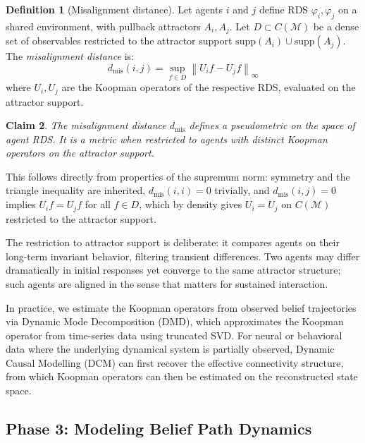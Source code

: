 \documentclass[11pt,a4paper]{article}
\newtheorem{claim}{Claim}[section]
\theoremstyle{definition}
\newtheorem{definition}[claim]{Definition}
\newcommand{\cM}{\mathcal{M}}
\newcommand{\supp}{\mathrm{supp}}
\begin{document}
\begin{definition}[Misalignment distance]
\label{def:misalignment}
Let agents $i$ and $j$ define RDS $\varphi_i, \varphi_j$ on a shared environment, with pullback attractors $A_i, A_j$. Let $D \subset C(\cM)$ be a dense set of observables restricted to the attractor support $\supp(A_i) \cup \supp(A_j)$. The \emph{misalignment distance} is:
\begin{equation}
  d_{\mathrm{mis}}(i, j) = \sup_{f \in D} \left\| U_i f - U_j f \right\|_\infty
  \label{eq:misalignment_distance}
\end{equation}
where $U_i, U_j$ are the Koopman operators of the respective RDS, evaluated on the attractor support.
\end{definition}

\begin{claim}
\label{claim:metric_properties}
The misalignment distance $d_{\mathrm{mis}}$ defines a pseudometric on the space of agent RDS. It is a metric when restricted to agents with distinct Koopman operators on the attractor support.
\end{claim}

This follows directly from properties of the supremum norm: symmetry and the triangle inequality are inherited, $d_{\mathrm{mis}}(i,i) = 0$ trivially, and $d_{\mathrm{mis}}(i,j) = 0$ implies $U_i f = U_j f$ for all $f \in D$, which by density gives $U_i = U_j$ on $C(\cM)$ restricted to the attractor support.

The restriction to attractor support is deliberate: it compares agents on their long-term invariant behavior, filtering transient differences. Two agents may differ dramatically in initial responses yet converge to the same attractor structure; such agents are aligned in the sense that matters for sustained interaction.

In practice, we estimate the Koopman operators from observed belief trajectories via Dynamic Mode Decomposition (DMD), which approximates the Koopman operator from time-series data using truncated SVD. For neural or behavioral data where the underlying dynamical system is partially observed, Dynamic Causal Modelling (DCM) \citep{friston2003dynamic} can first recover the effective connectivity structure, from which Koopman operators can then be estimated on the reconstructed state space.


\subsection{Phase 3: Modeling Belief Path Dynamics}
\label{sec:phase3}
\end{document}
